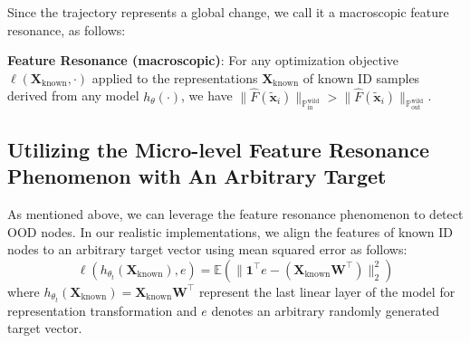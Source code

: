 Since the trajectory represents a global change, we call it a macroscopic feature resonance, as follows:
\begin{definition}
    \textbf{Feature Resonance (macroscopic)}: For any optimization objective $ \ell(\boldsymbol{ X}_{\text{known}},\cdot)$ applied to the representations $\boldsymbol{X}_{\text{known}}$ of known ID samples derived from any model $h_{\theta}(\cdot)$, we have $\parallel \hat{F}(\tilde{\mathbf{x}}_i) \parallel_{\mathbb{P}^{\mathrm{wild}}_{\mathrm{in}}} > \parallel \hat{F}(\tilde{\mathbf{x}}_i) \parallel_{\mathbb{P}^{\mathrm{wild}}_{\mathrm{out}}}$.
\end{definition}

\subsection{Utilizing the Micro-level  Feature Resonance Phenomenon with An Arbitrary Target}\label{subsec-utilizing-FR}

As mentioned above, we can leverage 
the feature resonance phenomenon to detect OOD nodes. In our realistic implementations, we align the features of known ID nodes to an arbitrary target vector using mean squared error as follows:
\begin{equation}
    \ell(h_{\theta_t}({\boldsymbol X}_{\text{known}}),e) = \mathbb{E}(\parallel \mathbf{1}^{\top}e - ({\boldsymbol X}_{\text{known}}\mathbf{W}^{\top})\parallel^2_2 )
\end{equation}
where $h_{\theta_t}({\boldsymbol X}_{\text{known}}) = {\boldsymbol X}_{\text{known}}\mathbf{W}^{\top}$ represent the last linear layer of the model for representation transformation and $e$ denotes an arbitrary randomly generated target vector.

